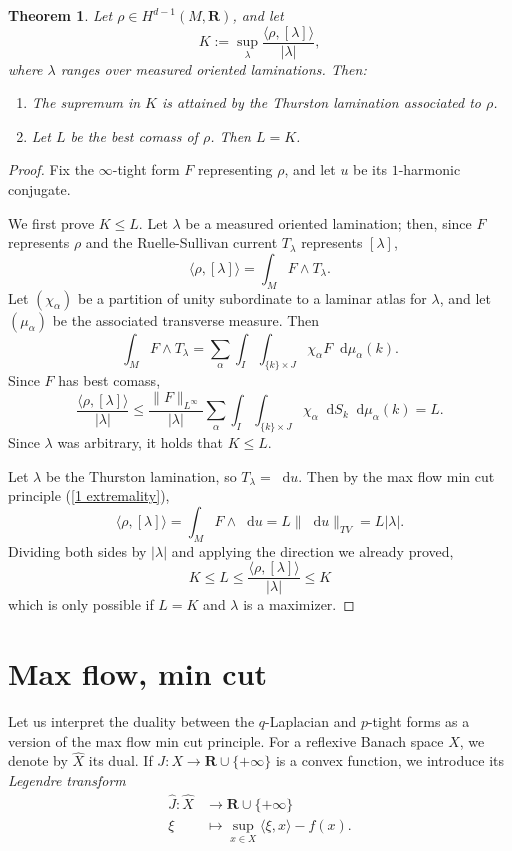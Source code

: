 \documentclass[reqno,11pt]{amsart}
\newcommand{\RR}{\mathbf{R}}
\newcommand*\dif{\mathop{}\!\mathrm{d}}
\newcommand{\dfn}[1]{\emph{#1}\index{#1}}
\newtheorem{theorem}{Theorem}[section]
\theoremstyle{definition}
\numberwithin{equation}{section}
\begin{document}
\begin{theorem}\label{L equals K}
	Let $\rho \in H^{d - 1}(M, \RR)$, and let 
	$$K := \sup_\lambda \frac{\langle \rho, [\lambda]\rangle}{|\lambda|},$$
	where $\lambda$ ranges over measured oriented laminations. Then:
\begin{enumerate}
	\item The supremum in $K$ is attained by the Thurston lamination associated to $\rho$.
	\item Let $L$ be the best comass of $\rho$. Then $L = K$.
\end{enumerate}
\end{theorem}
\begin{proof}
Fix the $\infty$-tight form $F$ representing $\rho$, and let $u$ be its $1$-harmonic conjugate.

We first prove $K \leq L$.
Let $\lambda$ be a measured oriented lamination; then, since $F$ represents $\rho$ and the Ruelle-Sullivan current $T_\lambda$ represents $[\lambda]$,
$$\langle \rho, [\lambda]\rangle = \int_M F \wedge T_\lambda.$$
Let $(\chi_\alpha)$ be a partition of unity subordinate to a laminar atlas for $\lambda$, and let $(\mu_\alpha)$ be the associated transverse measure. Then 
$$\int_M F \wedge T_\lambda = \sum_\alpha \int_I \int_{\{k\} \times J} \chi_\alpha F \dif \mu_\alpha(k).$$
Since $F$ has best comass,
$$\frac{\langle \rho, [\lambda] \rangle}{|\lambda|}
\leq \frac{\|F\|_{L^\infty}}{|\lambda|} \sum_\alpha \int_I \int_{\{k\} \times J} \chi_\alpha \dif S_k \dif \mu_\alpha(k) = L.$$
Since $\lambda$ was arbitrary, it holds that $K \leq L$.

Let $\lambda$ be the Thurston lamination, so $T_\lambda = \dif u$.
Then by the max flow min cut principle (\ref{1 extremality}),
$$\langle \rho, [\lambda]\rangle = \int_M F \wedge \dif u = L \|\dif u\|_{TV} = L|\lambda|.$$
Dividing both sides by $|\lambda|$ and applying the direction we already proved,
$$K \leq L \leq \frac{\langle \rho, [\lambda]\rangle}{|\lambda|} \leq K$$
which is only possible if $L = K$ and $\lambda$ is a maximizer.
\end{proof}

\appendix 
\section{Max flow, min cut}\label{Max Flow Min Cut}
Let us interpret the duality between the $q$-Laplacian and $p$-tight forms as a version of the max flow min cut principle. 
For a reflexive Banach space $X$, we denote by $\hat X$ its dual.
If $J: X \to \RR \cup \{+\infty\}$ is a convex function, we introduce its \dfn{Legendre transform}
\begin{align*}
	\hat J: \hat X &\to \RR \cup \{+\infty\}\\
	\xi &\mapsto \sup_{x \in X} \langle \xi, x\rangle - f(x).
\end{align*}
\end{document}
